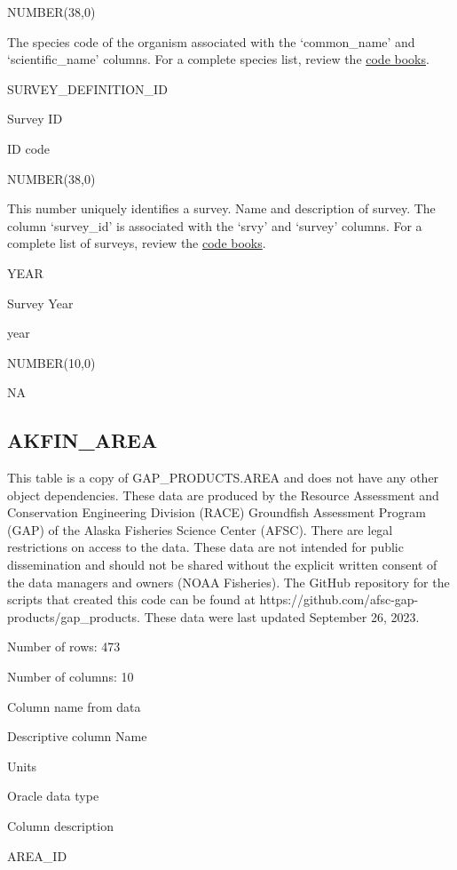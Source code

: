 \documentclass[
  letterpaper,
  oneside,
  open=any]{scrbook}
\begin{document}
NUMBER(38,0)

The species code of the organism associated with the `common\_name' and
`scientific\_name' columns. For a complete species list, review the
\href{https://www.fisheries.noaa.gov/resource/document/groundfish-survey-species-code-manual-and-data-codes-manual}{code
books}.

SURVEY\_DEFINITION\_ID

Survey ID

ID code

NUMBER(38,0)

This number uniquely identifies a survey. Name and description of
survey. The column `survey\_id' is associated with the `srvy' and
`survey' columns. For a complete list of surveys, review the
\href{https://www.fisheries.noaa.gov/resource/document/groundfish-survey-species-code-manual-and-data-codes-manual}{code
books}.

YEAR

Survey Year

year

NUMBER(10,0)

NA

\hypertarget{akfin_area}{%
\subsection{AKFIN\_AREA}\label{akfin_area}}

This table is a copy of GAP\_PRODUCTS.AREA and does not have any other
object dependencies. These data are produced by the Resource Assessment
and Conservation Engineering Division (RACE) Groundfish Assessment
Program (GAP) of the Alaska Fisheries Science Center (AFSC). There are
legal restrictions on access to the data. These data are not intended
for public dissemination and should not be shared without the explicit
written consent of the data managers and owners (NOAA Fisheries). The
GitHub repository for the scripts that created this code can be found at
https://github.com/afsc-gap-products/gap\_products. These data were last
updated September 26, 2023.

Number of rows: 473

Number of columns: 10

Column name from data

Descriptive column Name

Units

Oracle data type

Column description

AREA\_ID
\end{document}
